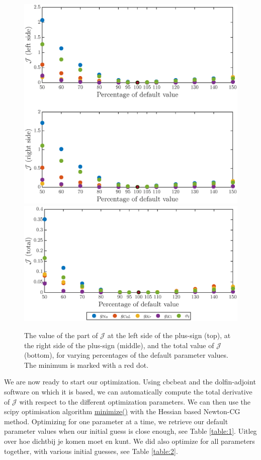 \documentclass[12pt,a4paper]{article}
\begin{document}
\begin{figure}
\includegraphics[trim=0cm 0cm 0cm 0cm, clip=true, width=1\linewidth]{functional_values} 
\includegraphics[trim=0cm 0cm 0cm 0cm, clip=true, width=1\linewidth]{functional_values2} 
    \caption{The value of the part of $\mathcal{J}$ at the left side of the plus-sign (top), at the right side of the plus-sign (middle), and the total value of $\mathcal{J}$ (bottom), for varying percentages of the default parameter values. The minimum is marked with a red dot. }
    \label{fig:8}
\end{figure}
\newline
We are now ready to start our optimization. Using cbcbeat and the dolfin-adjoint software on which it is based, we can automatically compute the total derivative of $\mathcal{J}$ with respect to the different optimization parameters. We can then use the scipy optimisation algorithm \url{minimize()} with the Hessian based Newton-CG method. Optimizing for one parameter at a time, we retrieve our default parameter values when our initial guess is close enough, see Table \ref{table:1}. Uitleg over hoe dichtbij je komen moet en kunt. We did also optimize for all parameters together, with various initial guesses, see Table \ref{table:2}. 
\end{document}
